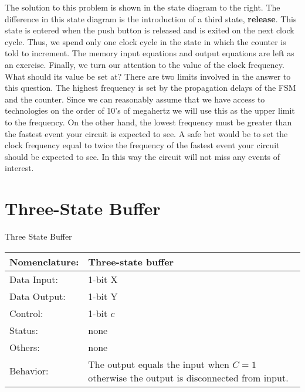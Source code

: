         The solution to this problem is shown in the state diagram to
        the right.  The difference in this state diagram is the introduction
        of a third state, \textbf{ release}.  This state is entered when the
        push button is released and is exited on the next clock cycle.
        Thus, we spend only one clock cycle in the state in which the
        counter is told to increment.  The memory input equations and
        output equations are left as an exercise.
        Finally, we turn our attention to the value of the clock frequency.
        What should its value be set at?  There are two limits involved
        in the answer to this question.  The highest frequency is set by
        the propagation delays of the FSM and the counter.  Since we
        can reasonably assume that we have access to technologies on the
        order of 10's of megahertz we will use this as the upper limit
        to the frequency.  On the other hand, the lowest
        frequency must be greater than the fastest event your circuit
        is expected to see.  A safe bet would be to set the clock
        frequency equal to twice the frequency of the fastest event your
        circuit should be expected to see.   In this way the circuit
        will not miss any events of interest.

        \section{Three-State Buffer}
        \begin{buildingblock}{Three State Buffer}
            \label{buildingblock:threeStateBuffer}
                \begin{tabular}{|l|p{3.5in}|} \hline
                    Nomenclature:  & Three-state buffer    \\ \hline
                    Data Input:    & 1-bit X        \\ \hline
                    Data Output:   & 1-bit Y        \\ \hline
                    Control:       & 1-bit $c$              \\ \hline
                    Status:        & none            \\ \hline
                    Others:        & none            \\ \hline
                    Behavior:      & The output equals the input when
                    $C=1$ otherwise the output is
                    disconnected from input. \\ \hline
                \end{tabular}
                \label{page:tsb}
            \end{buildingblock}

